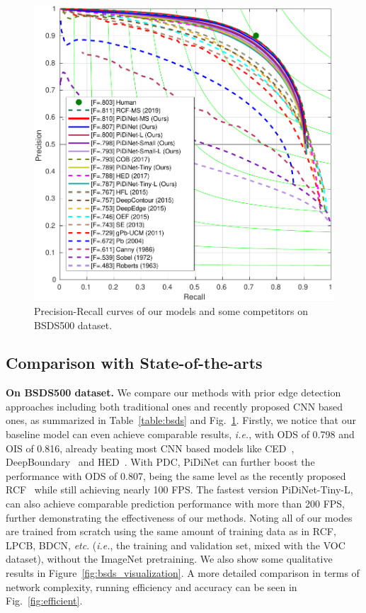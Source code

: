 \documentclass[10pt,twocolumn,letterpaper]{article}
\begin{document}
\begin{figure}[t!]
    \centering
    \includegraphics[width=1\linewidth]{images/bsds_pr.pdf}
    \caption{Precision-Recall curves of our models and some competitors on BSDS500 dataset.}
    \label{fig:bsds_pr}
\end{figure}



\subsection{Comparison with State-of-the-arts}

\vspace{0.3em}
\noindent \textbf{On BSDS500 dataset.} \quad We compare our methods with prior edge detection approaches including both traditional ones and recently proposed CNN based ones, as summarized in Table~\ref{table:bsds} and Fig.~\ref{fig:bsds_pr}. Firstly, we notice that our baseline model can even achieve comparable results, \emph{i.e.}, with ODS of 0.798 and OIS of 0.816, already beating most CNN based models like CED~\cite{wang2017ced}, DeepBoundary~\cite{kokkinos2015deepboundary} and HED~\cite{xie2017holistically}. With PDC, PiDiNet can further boost the performance with ODS of 0.807, being the same level as the recently proposed RCF~\cite{liu2019richer} while still achieving nearly 100 FPS. The fastest version PiDiNet-Tiny-L, can also achieve comparable prediction performance with more than 200 FPS, further demonstrating the effectiveness of our methods. Noting all of our modes are trained from scratch using the same amount of training data as in RCF, LPCB, BDCN, \emph{etc}. (\emph{i.e.}, the training and validation set, mixed with the VOC dataset), without the ImageNet pretraining. We also show some qualitative results in Figure~\ref{fig:bsds_visualization}. A more detailed comparison in terms of network complexity, running efficiency and accuracy can be seen in Fig.~\ref{fig:efficient}. 
\end{document}
